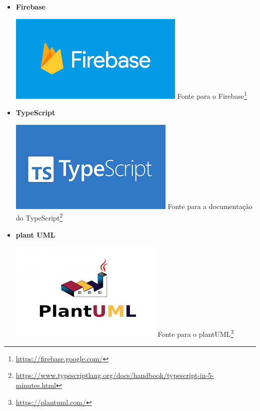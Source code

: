 \documentclass[12pt, openany, oneside, a4paper, english, brazil]{abntex2}   %
\begin{document}
\begin{itemize}
    \item \textbf{Firebase}
    \begin{center}
    \includegraphics[width=0.5\linewidth]{figuras/Tecnologies/Firebase.png}
    \label{fig:Firebase}
    Fonte para o Firebase\footnote{\url{https://firebase.google.com/}}
\end{center}




    \item \textbf{TypeScript}
    \begin{center}
    \includegraphics[width=0.5\linewidth]{figuras/Tecnologies/TypeScript.png}
    \label{fig:TypeScript}
    Fonte para a documentação do TypeScript\footnote{\url{https://www.typescriptlang.org/docs/handbook/typescript-in-5-minutes.html}}
    \end{center}



    \item \textbf{plant UML}
    \begin{center}
    \includegraphics[width=0.5\linewidth]{figuras/Tecnologies/plantUML.jpeg}
    \label{fig:plant UML}
    Fonte para o plantUML\footnote{\url{https://plantuml.com/}}
    \end{center}





\end{itemize}
\end{document}
